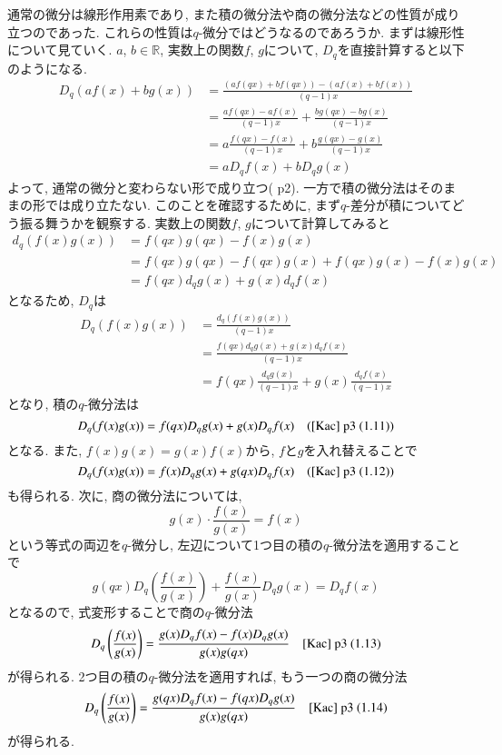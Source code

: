 \documentclass[11pt]{jsreport}
\theoremstyle{mystyle}
\newcommand{\R}{\mathbb{R}}
\newcommand{\0}{\textbf{0}}
\begin{document}
通常の微分は線形作用素であり, また積の微分法や商の微分法などの性質が成り立つのであった. これらの性質は$q$-微分ではどうなるのであろうか. まずは線形性について見ていく. $a$, $b \in \R$, 実数上の関数$f$, $g$について, $D_q$を直接計算すると以下のようになる. 
\begin{align*}
  D_q (af(x) + bg(x)) &= \frac{(af(qx) + bf(qx)) - (af(x) + bf(x))}{(q - 1)x}\\
                           &= \frac{af(qx) - af(x)}{(q - 1)x} + \frac{bg(qx) - bg(x)}{(q - 1)x}\\
                           &= a \frac{f(qx) - f(x)}{(q - 1)x} + b \frac{g(qx) - g(x)}{(q - 1)x}\\
                           &= a D_q f(x) + b D_q g(x)
\end{align*}
よって, 通常の微分と変わらない形で成り立つ(\cite{Kac} p2). 一方で積の微分法はそのままの形では成り立たない. このことを確認するために, まず$q$-差分が積についてどう振る舞うかを観察する. 実数上の関数$f$, $g$について計算してみると 
\begin{align*}
  d_q (f(x)g(x)) &= f(qx)g(qx) - f(x)g(x) \\
                    &= f(qx)g(qx) - f(qx)g(x) + f(qx)g(x) - f(x)g(x)\\
                    &= f(qx) d_q g(x) + g(x) d_q f(x)
\end{align*}
となるため, $D_q$は
\begin{align*}
  D_q(f(x)g(x)) &= \frac{d_q(f(x)g(x))}{(q - 1)x}\\
                   &= \frac{f(qx) d_q g(x) + g(x) d_q f(x)}{(q - 1)x}\\
                   &= f(qx) \frac{d_q g(x)}{(q - 1)x} + g(x) \frac{d_q f(x)}{(q - 1)x}
\end{align*}
となり, 積の$q$-微分法は
\[
  D_q (f(x) g(x)) = f(qx) D_q g(x) + g(x) D_q f(x) \quad \text{(\cite{Kac} p3 (1.11))}
\]
となる. また, $f(x)g(x) = g(x)f(x)$から, $f$と$g$を入れ替えることで
\[
  D_q (f(x) g(x)) = f(x) D_q g(x) + g(qx) D_q f(x) \quad \text{(\cite{Kac} p3 (1.12))}
\]
も得られる. 次に, 商の微分法については, 
\[
  g(x) \cdot \frac{f(x)}{g(x)} = f(x)
\]
という等式の両辺を$q$-微分し, 左辺について1つ目の積の$q$-微分法を適用することで
\[
  g(qx) D_q \left( \frac{f(x)}{g(x)} \right) + \frac{f(x)}{g(x)} D_q g(x) = D_qf (x)
\]
となるので, 式変形することで商の$q$-微分法
\[
  D_q \left( \frac{f(x)}{g(x)} \right) = \frac{g(x) D_q f(x) - f(x) D_q g(x)}{g(x) g(qx)}
  \quad \text{\cite{Kac} p3 (1.13)}
\]
が得られる. 2つ目の積の$q$-微分法を適用すれば, もう一つの商の微分法
\[
  D_q \left( \frac{f(x)}{g(x)} \right) = \frac{g(qx) D_q f(x) - f(qx) D_q g(x)}{g(x) g(qx)}
  \quad \text{\cite{Kac} p3 (1.14)}
\]
が得られる. 
\end{document}

